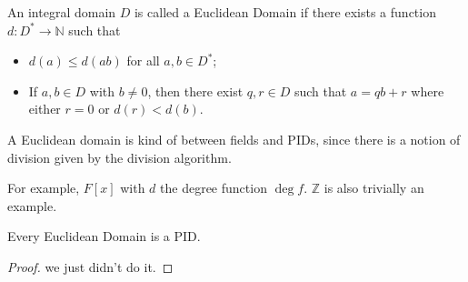 \begin{definition}\label{dfn:3.5}
	An integral domain $D$ is called a Euclidean Domain if there exists a function $d : D^* \to \mathbb{N} $ such that
	\begin{itemize}
		\item $d(a)\leq d(ab)$ for all $a,b\in D^*$;
		\item If $a,b\in D$ with $b\neq 0$, then there exist $q,r\in D$ such that $a=qb+r$ where either $r=0$ or $d(r)<d(b)$.
	\end{itemize}
\end{definition}

A Euclidean domain is kind of between fields and PIDs, since there is a notion of division given by the division algorithm.

For example, $F[x]$ with $d$ the degree function $\operatorname{deg} f$. $\mathbb{Z} $ is also trivially an example.

\begin{theorem}\label{thm:3.4}
	Every Euclidean Domain is a PID.
\end{theorem}
\begin{proof}
	we just didn't do it.
\end{proof}
